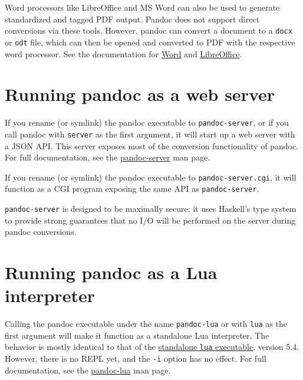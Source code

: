 \documentclass[
  a4paper,
]{article}
\begin{document}
Word processors like LibreOffice and MS Word can also be used to
generate standardized and tagged PDF output. Pandoc does not support
direct conversions via these tools. However, pandoc can convert a
document to a \texttt{docx} or \texttt{odt} file, which can then be
opened and converted to PDF with the respective word processor. See the
documentation for
\href{https://support.microsoft.com/en-us/office/create-accessible-pdfs-064625e0-56ea-4e16-ad71-3aa33bb4b7ed}{Word}
and
\href{https://help.libreoffice.org/7.1/en-US/text/shared/01/ref_pdf_export_general.html}{LibreOffice}.

\hypertarget{running-pandoc-as-a-web-server}{%
\section{Running pandoc as a web
server}\label{running-pandoc-as-a-web-server}}

If you rename (or symlink) the pandoc executable to
\texttt{pandoc-server}, or if you call pandoc with \texttt{server} as
the first argument, it will start up a web server with a JSON API. This
server exposes most of the conversion functionality of pandoc. For full
documentation, see the
\href{https://github.com/jgm/pandoc/blob/master/doc/pandoc-server.md}{pandoc-server}
man page.

If you rename (or symlink) the pandoc executable to
\texttt{pandoc-server.cgi}, it will function as a CGI program exposing
the same API as \texttt{pandoc-server}.

\texttt{pandoc-server} is designed to be maximally secure; it uses
Haskell's type system to provide strong guarantees that no I/O will be
performed on the server during pandoc conversions.

\hypertarget{running-pandoc-as-a-lua-interpreter}{%
\section{Running pandoc as a Lua
interpreter}\label{running-pandoc-as-a-lua-interpreter}}

Calling the pandoc executable under the name \texttt{pandoc-lua} or with
\texttt{lua} as the first argument will make it function as a standalone
Lua interpreter. The behavior is mostly identical to that of the
\href{https://www.lua.org/manual/5.4/manual.html\#7}{standalone
\texttt{lua} executable}, version 5.4. However, there is no REPL yet,
and the \texttt{-i} option has no effect. For full documentation, see
the
\href{https://github.com/jgm/pandoc/blob/master/doc/pandoc-lua.md}{pandoc-lua}
man page.
\end{document}
